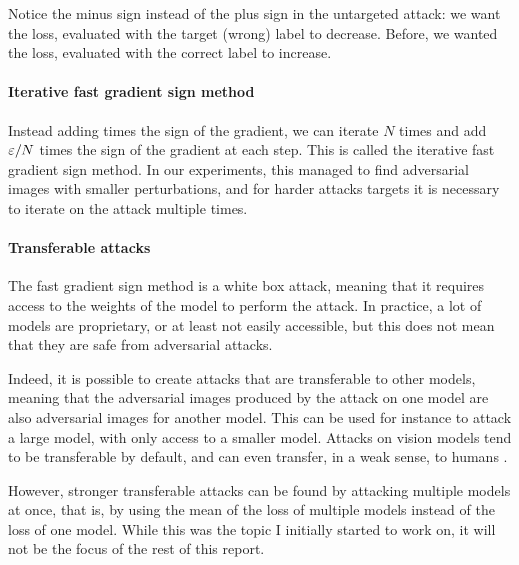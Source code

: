 \documentclass[]{scrarticle}
\begin{document}
Notice the minus sign instead of the plus sign in the untargeted attack:
we want the loss, evaluated with the target (wrong) label
to decrease. Before, we wanted the loss, evaluated with the correct label
to increase.

\paragraph{Iterative fast gradient sign method}
Instead adding \e times the sign of the gradient, we can iterate
$N$ times and add $\varepsilon / N$ times the sign of the gradient at each step.
This is called the iterative fast gradient sign method.
In our experiments, this managed to find adversarial images with
smaller perturbations, and for harder attacks targets it
is necessary to iterate on the attack multiple times.



\paragraph{Transferable attacks}
The fast gradient sign method is a white box attack,
meaning that it requires access to the weights of the model
to perform the attack. In practice, a lot of models are proprietary,
or at least not easily accessible, but this does not mean that
they are safe from adversarial attacks.

Indeed, it is possible to create attacks that are transferable
to other models, meaning that the adversarial images produced
by the attack on one model are also adversarial images for another model.
This can be used for instance to attack a large model, with
only access to a smaller model.
Attacks on vision models tend to be transferable by default,
and can even transfer, in a weak sense, to humans \cite{Elsayed2018AdversarialET}.

However, stronger transferable attacks can be found by
attacking multiple models at once, that is, by using
the mean of the loss of multiple models instead of the loss of one model.
While this was the topic I initially started to work on,
it will not be the focus of the rest of this report.


\end{document}
